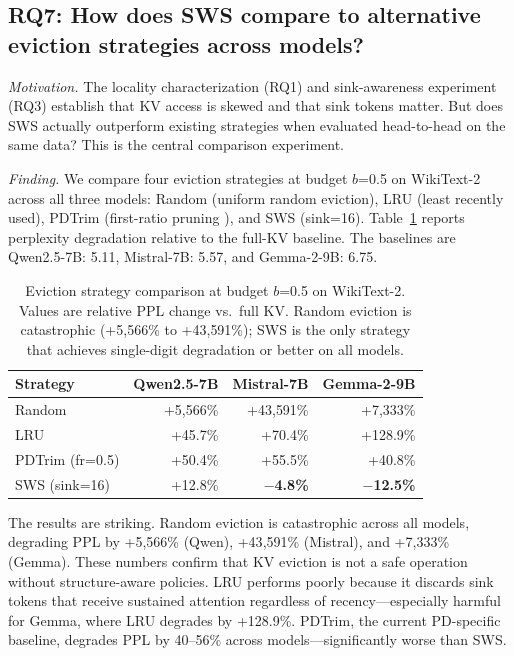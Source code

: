 \documentclass[11pt]{article}
\newcommand{\method}{SWS}
\newcommand{\sws}{SWS}
\newcommand{\pct}{\%}
\theoremstyle{definition}
\theoremstyle{plain}
\begin{document}

\subsection{RQ7: How does SWS compare to alternative eviction strategies across models?}
\label{sec:rq7}

\emph{Motivation.}  The locality characterization (RQ1) and sink-awareness experiment (RQ3) establish that KV access is skewed and that sink tokens matter.  But does \method{} actually outperform existing strategies when evaluated head-to-head on the same data?  This is the central comparison experiment.

\emph{Finding.}  We compare four eviction strategies at budget $b$=0.5 on WikiText-2 across all three models: Random (uniform random eviction), LRU (least recently used), PDTrim (first-ratio pruning \citep{pdtrim}), and \sws{} (sink=16).  Table~\ref{tab:eviction-compare} reports perplexity degradation relative to the full-KV baseline.  The baselines are Qwen2.5-7B: 5.11, Mistral-7B: 5.57, and Gemma-2-9B: 6.75.

\begin{table}[t]
\centering
\caption{Eviction strategy comparison at budget $b$=0.5 on WikiText-2.  Values are relative PPL change vs.\ full KV.  Random eviction is catastrophic (+5{,}566\pct{} to +43{,}591\pct{}); \sws{} is the only strategy that achieves single-digit degradation or better on all models.}
\label{tab:eviction-compare}
\small
\begin{tabular}{lrrr}
\toprule
Strategy & Qwen2.5-7B & Mistral-7B & Gemma-2-9B \\
\midrule
Random & +5{,}566\pct{} & +43{,}591\pct{} & +7{,}333\pct{} \\
LRU & +45.7\pct{} & +70.4\pct{} & +128.9\pct{} \\
PDTrim (fr=0.5) & +50.4\pct{} & +55.5\pct{} & +40.8\pct{} \\
\sws{} (sink=16) & +12.8\pct{} & \textbf{$-$4.8\pct{}} & \textbf{$-$12.5\pct{}} \\
\bottomrule
\end{tabular}
\end{table}

The results are striking.  Random eviction is catastrophic across all models, degrading PPL by +5{,}566\pct{} (Qwen), +43{,}591\pct{} (Mistral), and +7{,}333\pct{} (Gemma).  These numbers confirm that KV eviction is not a safe operation without structure-aware policies.  LRU performs poorly because it discards sink tokens that receive sustained attention regardless of recency---especially harmful for Gemma, where LRU degrades by +128.9\pct{}.  PDTrim, the current PD-specific baseline, degrades PPL by 40--56\pct{} across models---significantly worse than \sws{}.
\end{document}
